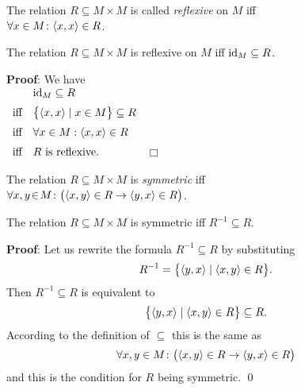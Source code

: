 \begin{Definition} 
The relation $R \subseteq M \times M$ is called \emph{reflexive} on  $M$ iff \\[0.2cm]
\hspace*{1.3cm} $\forall x\in M \colon \pair(x,x) \in R$. 
\end{Definition}

\begin{Proposition}
The relation $R \subseteq M \times M$ is  reflexive on $M$ iff $\mbox{\rm id}_M \subseteq R$.
\end{Proposition}

\noindent
\textbf{Proof}: We have
\\[0.2cm]
\hspace*{1.3cm}
$
\begin{array}[b]{cl}
              & \id_M \subseteq R \\[0.2cm]
\mbox{iff} & \bigl\{ \pair(x,x) \mid x \in M \bigr\} \subseteq R \\[0.2cm] 
\mbox{iff} & \forall x \in M: \pair(x,x) \in R \\[0.2cm] 
\mbox{iff} & \mbox{$R$ is reflexive.}  
\end{array}
$
\hspace*{\fill} $\Box$
\vspace*{0.2cm}

\begin{Definition}
The relation $R \subseteq M \times M$ is \emph{symmetric} iff \\[0.2cm]
\hspace*{1.3cm} 
$\forall x,y\el M \colon \bigl(\pair(x,y) \in R \rightarrow\pair(y,x)\in R\bigr)$. 
\end{Definition}

\begin{Proposition}
The relation $R \subseteq M \times M$ is symmetric iff $R^{-1} \subseteq R$.
\end{Proposition}

\noindent
\textbf{Proof}:
Let us rewrite the formula $R^{-1} \subseteq R$ by substituting
\[ R^{-1} = \bigl\{ \pair(y,x) \mid \pair(x,y) \in R \bigr\}. \]
Then $R^{-1} \subseteq R$ is equivalent to
\[ \bigl\{ \pair(y,x) \mid \pair(x,y) \in R \bigr\} \subseteq R. \]
According to the definition of $\subseteq$ this is the same as
\[ \forall x, y \in M \colon \bigl(\pair(x,y) \in R \rightarrow\pair(y,x) \in R\bigr) \]
and this is the condition for $R$ being symmetric. \qed
\vspace*{0.2cm}

